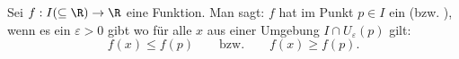 Sei $f: I (\subseteq \R) \to \R$ eine Funktion. Man sagt: $f$ hat im Punkt $p \in I$ ein  (bzw. ), wenn es ein $\varepsilon > 0$ gibt wo für alle $x$ aus einer Umgebung $I \cap U_\varepsilon(p)$ gilt:
$$f(x) \leq f(p) \qquad \text{bzw.} \qquad f(x) \geq f(p).$$